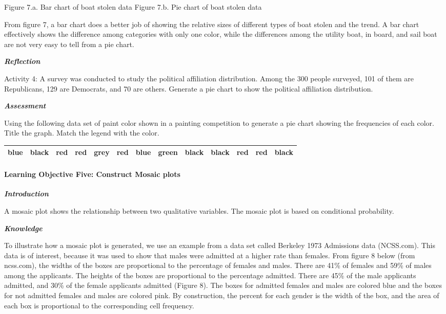 Figure 7.a. Bar chart of boat stolen data Figure 7.b. Pie chart of boat
stolen data

From figure 7, a bar chart does a better job of showing the relative
sizes of different types of boat stolen and the trend. A bar chart
effectively shows the difference among categories with only one color,
while the differences among the utility boat, in board, and sail boat
are not very easy to tell from a pie chart.

\emph{\textbf{Reflection}}

Activity 4: A survey was conducted to study the political affiliation
distribution. Among the 300 people surveyed, 101 of them are
Republicans, 129 are Democrats, and 70 are others. Generate a pie chart
to show the political affiliation distribution.

\emph{\textbf{Assessment}}

Using the following data set of paint color shown in a painting
competition to generate a pie chart showing the frequencies of each
color. Title the graph. Match the legend with the color.

\begin{longtable}[]{@{}lllllllllllll@{}}
\toprule
\endhead
blue & black & red & red & grey & red & blue & green & black & black &
red & red & black\tabularnewline
\bottomrule
\end{longtable}

\hypertarget{learning-objective-five-construct-mosaic-plots}{%
\paragraph{Learning Objective Five: Construct Mosaic
plots}\label{learning-objective-five-construct-mosaic-plots}}

\emph{\textbf{Introduction}}

A mosaic plot shows the relationship between two qualitative variables.
The mosaic plot is based on conditional probability.

\emph{\textbf{Knowledge}}

To illustrate how a mosaic plot is generated, we use an example from a
data set called Berkeley 1973 Admissions data (NCSS.com). This data is
of interest, because it was used to show that males were admitted at a
higher rate than females. From figure 8 below (from ncss.com), the
widths of the boxes are proportional to the percentage of females and
males. There are 41\% of females and 59\% of males among the applicants.
The heights of the boxes are proportional to the percentage admitted.
There are 45\% of the male applicants admitted, and 30\% of the female
applicants admitted (Figure 8). The boxes for admitted females and males
are colored blue and the boxes for not admitted females and males are
colored pink. By construction, the percent for each gender is the width
of the box, and the area of each box is proportional to the
corresponding cell frequency.


